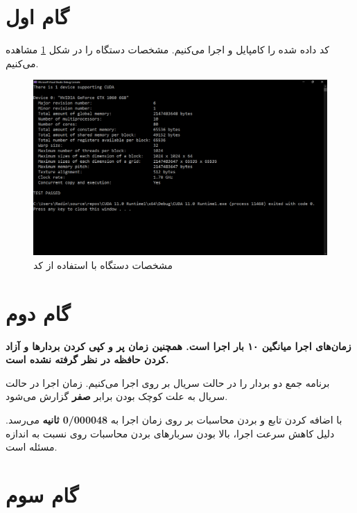 \documentclass{HW}
\begin{document}
\pagestyle{pages}
\thispagestyle{first_page}

\section{گام اول}

کد  داده شده را کامپایل و اجرا می‌کنیم. مشخصات دستگاه را در شکل
\ref{fig:query}
مشاهده می‌کنیم.

\begin{figure}[ht!]
\begin{center}
	\includegraphics[width=15cm]{images/query}
\end{center}
\caption{مشخصات دستگاه با استفاده از کد }
\label{fig:query}
\end{figure}

\section{گام دوم}

\begin{center}
\textbf{
زمان‌های اجرا میانگین ۱۰ بار اجرا است. همچنین زمان پر و کپی کردن بردارها و آزاد کردن حافظه در نظر گرفته نشده است.
}
\end{center}

برنامه جمع دو بردار را در حالت سریال بر روی  اجرا می‌کنیم. زمان اجرا در حالت سریال به علت کوچک بودن برابر
\textbf{صفر}
 گزارش می‌شود.

با اضافه کردن تابع  و بردن محاسبات بر روی  زمان اجرا به
\textbf{0/000048 ثانیه}
می‌رسد. دلیل کاهش سرعت اجرا، بالا بودن سربارهای بردن محاسبات روی  نسبت به اندازه مسئله است.

\section{گام سوم}
\end{document}
